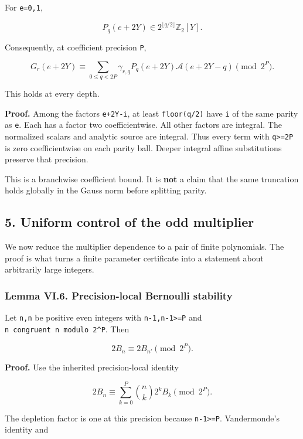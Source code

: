 \documentclass[11pt,letterpaper]{article}
\begin{document}
For \texttt{e=0,1},

\[
P_q(e+2Y)\in2^{\lfloor q/2\rfloor}\mathbb Z_2[Y].
\]

Consequently, at coefficient precision \texttt{P},

\[
\boxed{
G_r(e+2Y)\equiv
\sum_{0\le q<2P}\gamma_{r,q}P_q(e+2Y)
\mathscr A(e+2Y-q)\pmod{2^P}.
} \tag{VI.11}
\]

This holds at every depth.

\textbf{Proof.} Among the factors \texttt{e+2Y-i}, at least \texttt{floor(q/2)} have \texttt{i} of the same parity as \texttt{e}. Each has a factor two coefficientwise. All other factors are integral. The normalized scalars and analytic source are integral. Thus every term with \texttt{q\textgreater{}=2P} is zero coefficientwise on each parity ball. Deeper integral affine substitutions preserve that precision.

This is a branchwise coefficient bound. It is \textbf{not} a claim that the same truncation holds globally in the Gauss norm before splitting parity.

\subsection{5. Uniform control of the odd multiplier}\label{uniform-control-of-the-odd-multiplier}

We now reduce the multiplier dependence to a pair of finite polynomials. The proof is what turns a finite parameter certificate into a statement about arbitrarily large integers.

\subsubsection{Lemma VI.6. Precision-local Bernoulli stability}\label{lemma-vi.6.-precision-local-bernoulli-stability}

Let \texttt{n,n\textquotesingle{}} be positive even integers with \texttt{n-1,n\textquotesingle{}-1\textgreater{}=P} and \texttt{n\ congruent\ n\textquotesingle{}\ modulo\ 2\^{}P}. Then

\[
2B_n\equiv2B_{n'}\pmod{2^P}.
\]

\textbf{Proof.} Use the inherited precision-local identity

\[
2B_n\equiv\sum_{k=0}^{P}\binom nk2^kB_k\pmod{2^P}.
\]

The depletion factor is one at this precision because \texttt{n-1\textgreater{}=P}. Vandermonde's identity and
\end{document}
